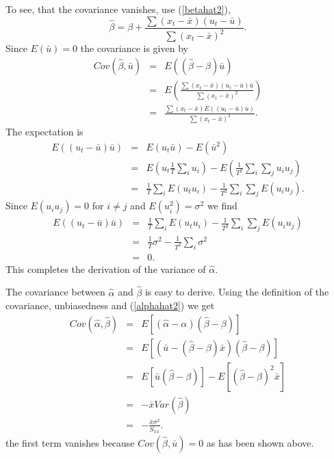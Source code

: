 \documentclass{article}
\begin{document}
To see, that the covariance vanishes, use (\ref{betahat2}), 
\[
\hat{\beta}=\beta +\frac{\sum \left( x_{t}-\bar{x}\right) \left( u_{t}-\bar{u%
}\right) }{\sum \left( x_{t}-\bar{x}\right) ^{2}}. 
\]%
Since $E(\bar{u})=0$ the covariance is given by
\begin{eqnarray*}
Cov(\hat{\beta},\bar{u}) &=&E\left( \left( \hat{\beta}-\beta \right) \bar{u}%
\right) \\
&=&E\left( \frac{\sum \left( x_{t}-\bar{x}\right) \left( u_{t}-\bar{u}%
\right) \bar{u}}{\sum \left( x_{t}-\bar{x}\right) ^{2}}\right) \\
&=&\frac{\sum \left( x_{t}-\bar{x}\right) E\left( \left( u_{t}-\bar{u}%
\right) \bar{u}\right) }{\sum \left( x_{t}-\bar{x}\right) ^{2}}.
\end{eqnarray*}%
The expectation is
\begin{eqnarray*}
E\left( \left( u_{t}-\bar{u}\right) \bar{u}\right) &=&E\left( u_{t}\bar{u}%
\right) -E\left( \bar{u}^{2}\right) \\
&=&E\left( u_{t}\frac{1}{T}\sum_{i}u_{i}\right) -E\left( \frac{1}{T^{2}}%
\sum_{i}\sum_{j}u_{i}u_{j}\right) \\
&=&\frac{1}{T}\sum_{i}E\left( u_{t}u_{i}\right) -\frac{1}{T^{2}}%
\sum_{i}\sum_{j}E\left( u_{i}u_{j}\right) .
\end{eqnarray*}%
Since $E(u_{i}u_{j})=0$ for $i\neq j$ and $E(u_{i}^{2})=\sigma ^{2}$ we find
\begin{eqnarray*}
E\left( \left( u_{t}-\bar{u}\right) \bar{u}\right) &=&\frac{1}{T}%
\sum_{i}E\left( u_{t}u_{i}\right) -\frac{1}{T^{2}}\sum_{i}\sum_{j}E\left(
u_{i}u_{j}\right) \\
&=&\frac{1}{T}\sigma ^{2}-\frac{1}{T^{2}}\sum_{i}\sigma ^{2} \\
&=&0.
\end{eqnarray*}
This completes the derivation of the variance of $\hat{\alpha}$.


The covariance between $\hat{\alpha}$ and $\hat{\beta}$ is easy to derive.
Using the definition of the covariance, unbiasedness and (\ref{alphahat2})
we get
\begin{eqnarray*}
Cov( \hat{\alpha},\hat{\beta}) &=&E\left[ \left( \hat{\alpha}%
-\alpha \right) \left( \hat{\beta}-\beta \right) \right] \\
&=&E\left[ \left( \bar{u}-\left( \hat{\beta}-\beta \right) \bar{x}\right)
\left( \hat{\beta}-\beta \right) \right] \\
&=&E\left[ \bar{u}\left( \hat{\beta}-\beta \right) \right] -E\left[ \left( 
\hat{\beta}-\beta \right) ^{2}\bar{x}\right] \\
&=&-\bar{x}Var(\hat{\beta}) \\
&=&-\frac{\bar{x}\sigma ^{2}}{S_{xx}}.
\end{eqnarray*}%
the first term vanishes because $Cov(\hat{\beta},\bar{u})=0$ as has been
shown above.
\end{document}
